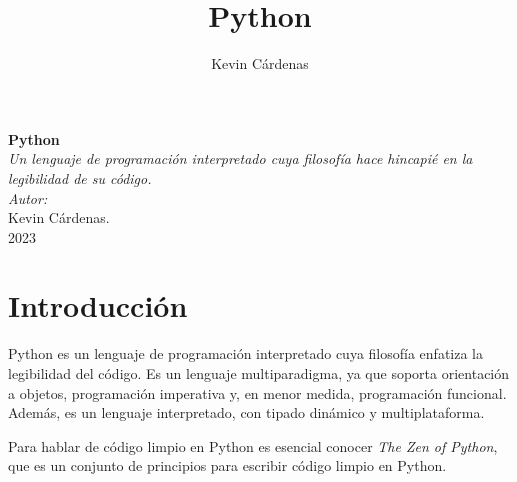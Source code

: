 \documentclass[executivepaper]{article}
\title{Python}
\author{Kevin Cárdenas}
\begin{document}
\begin{titlepage}
    \begin{center}
        {\Huge \textbf{Python}}\\[0.5cm]
        {\Large \emph{Un lenguaje de programación interpretado cuya filosofía hace hincapié en la legibilidad de su código.}}
        \\[15cm]

        \large\emph{Autor:}\\
        Kevin Cárdenas.
        \\[1cm]
        {\large 2023}
    \end{center}
\end{titlepage}
\newpage
\tableofcontents
\newpage

\section{Introducción}
Python es un lenguaje de programación interpretado cuya filosofía enfatiza la legibilidad del código. Es un lenguaje multiparadigma, ya que soporta orientación a objetos, programación imperativa y, en menor medida, programación funcional. Además, es un lenguaje interpretado, con tipado dinámico y multiplataforma.

Para hablar de código limpio en Python es esencial conocer \emph{The Zen of Python}, que es un conjunto de principios para escribir código limpio en Python.
\end{document}
